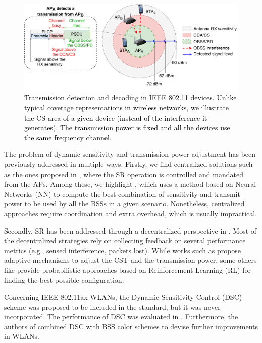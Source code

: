 \documentclass[preprint,12pt]{elsarticle}
\theoremstyle{plain}
\begin{document}
\begin{figure}[ht!]
	\centering
	\includegraphics[width=.9\textwidth]{fig_1_new}
	\caption{\textcolor{black}{Transmission detection and decoding in IEEE 802.11 devices. Unlike typical coverage representations in wireless networks, we illustrate the CS area of a given device (instead of the interference it generates). The transmission power is fixed and all the devices use the same frequency channel.}}
	\label{fig:spatial_reuse_11ax}
\end{figure}

The problem of dynamic sensitivity and transmission power adjustment has been previously addressed in multiple ways. \textcolor{black}{Firstly}, we find centralized solutions such as the ones proposed in \cite{li2011achieving, jamil2016novel, nakahira2014centralized}, where the SR operation is controlled and mandated from the APs. Among these, we highlight \cite{jamil2016novel}, which uses a method based on Neural Networks (NN) to compute the best combination of sensitivity and transmit power to be used by all the BSSs in a given scenario. Nonetheless, centralized approaches require coordination and extra overhead, which is usually impractical.

\textcolor{black}{Secondly}, SR has been addressed through a decentralized perspective in \cite{chevillat2005dynamic, tang2011improving, chau2017effective, wilhelmi2019collaborative, wilhelmi2019potential}. Most of the decentralized strategies rely on collecting feedback on several performance metrics (e.g., sensed interference, packets lost). While works such as \cite{chevillat2005dynamic, tang2011improving, chau2017effective} propose adaptive mechanisms to adjust the CST and the transmission power, some others like \cite{wilhelmi2019collaborative, wilhelmi2019potential} provide probabilistic approaches based on Reinforcement Learning (RL) for finding the best possible configuration. 

Concerning IEEE 802.11ax WLANs, the Dynamic Sensitivity Control (DSC) scheme was proposed to be included in the standard, but it was never incorporated. The performance of DSC was evaluated in \cite{afaqui2015evaluation, afaqui2016dynamic, kulkarni2015taming}. Furthermore, the authors of \cite{selinis2016evaluation, selinis2017exploiting} combined DSC with BSS color schemes to devise further improvements in WLANs.
\end{document}
